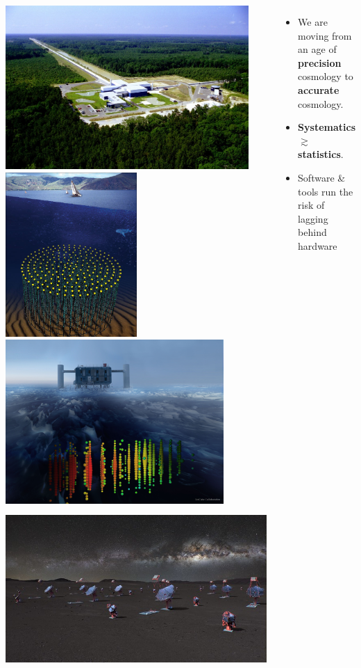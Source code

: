 \documentclass[aspectratio=169,handout]{beamer}
\begin{document}
\begin{frame}
\begin{columns}
        \includegraphics[height=0.191\textwidth]{figures/telescopes/ligo}%
        \includegraphics[height=0.191\textwidth]{figures/telescopes/km3n}%
        \includegraphics[height=0.191\textwidth]{figures/telescopes/icecube}%
        \includegraphics[height=0.191\textwidth]{figures/telescopes/CTA}%

        \begin{itemize}
            \item We are moving from an age of \textbf{precision} cosmology to \textbf{accurate} cosmology.
            \item \textbf{Systematics} $\gtrsim$ \textbf{statistics}.
            \item Software \& tools run the risk of lagging behind hardware
        \end{itemize}
        
    \end{columns}
\end{frame}
\end{document}
